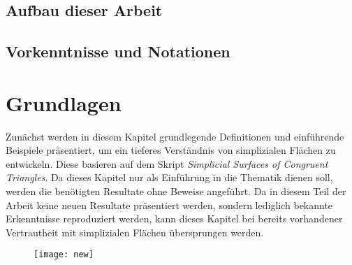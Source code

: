 \documentclass[12pt,titlepage,twoside,cleardoublepage]{article}
\theoremstyle{nummermitklammern}
\numberwithin{equation}{section}
\begin{document}
\subsection{Aufbau dieser Arbeit}
\subsection{Vorkenntnisse und Notationen}
\section{Grundlagen} 
Zunächst werden in diesem Kapitel grundlegende Definitionen und einführende Beispiele präsentiert, um ein tieferes Verständnis von simplizialen Flächen zu entwickeln. Diese basieren auf dem Skript \emph{Simplicial Surfaces of Congruent Triangles}. Da dieses Kapitel nur als Einführung in die Thematik dienen soll, werden die benötigten Resultate ohne Beweise angeführt. Da in diesem Teil der Arbeit keine neuen Resultate präsentiert werden, sondern lediglich bekannte Erkenntnisse reproduziert werden, kann dieses Kapitel bei bereits vorhandener Vertrautheit mit simplizialen Flächen übersprungen werden.
\begin{figure}[H]
\begin{center}
\texttt{[image: new]}
\end{center}
\end{figure}
\end{document}
